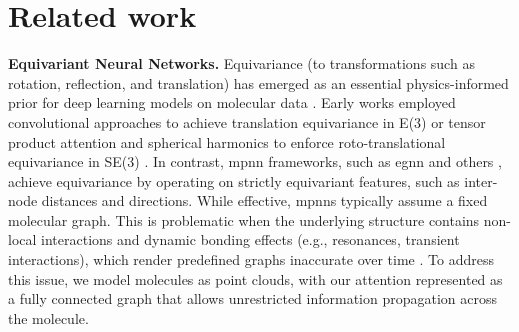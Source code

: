 \section{Related work}
\textbf{Equivariant Neural Networks.}
Equivariance (to transformations such as rotation, reflection, and translation) has emerged as an essential physics-informed prior for deep learning models on molecular data \cite{bronstein_geometric_2021, duval_hitchhikers_2023}. 
Early works employed convolutional approaches to achieve translation equivariance in E(3) \cite{weiler_3d_2018, wu_pointconv_2020} or tensor product attention and spherical harmonics to enforce roto-translational equivariance in SE(3) \cite{fuchs_se3-transformers_2020,thomas_tensor_2018}. In contrast, \gls{mpnn} frameworks, such as \gls{egnn} and others \cite{garcia_satorras_en_2021, gasteiger_gemnet_2021, huang_equivariant_2022}, achieve equivariance by operating on strictly equivariant features, such as inter-node distances and directions. While effective, \glspl{mpnn} typically assume a fixed molecular graph. This is problematic when the underlying structure contains non-local interactions and dynamic bonding effects (e.g., resonances, transient interactions), which render predefined graphs inaccurate over time \cite{knutson_dynamic_2022,luo_predicting_2021}. To address this issue, we model molecules as point clouds, with our attention represented as a fully connected graph that allows unrestricted information propagation across the molecule.


